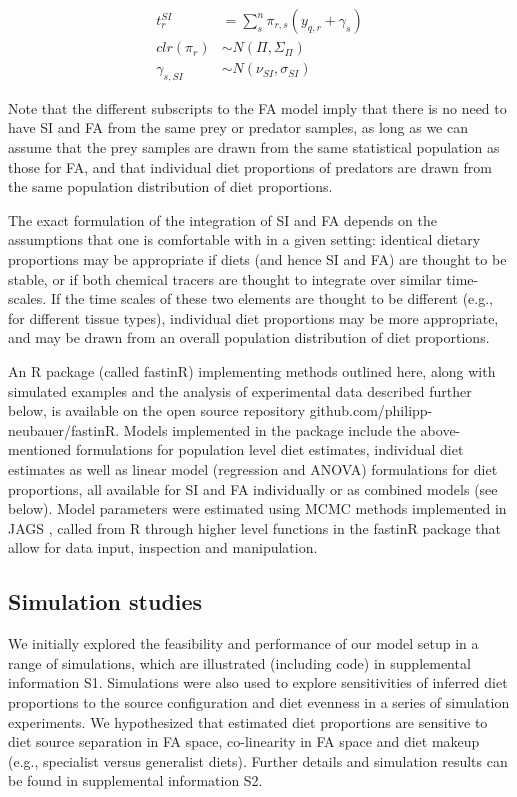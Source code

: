 \documentclass{article}%
\begin{document}
\begin{spacing}{1.9}
\begin{flushleft}
\begin{align}
\label{eq:3}
t_{r}^{SI} &=  \sum_{s}^n  \pi_{r,s}  \left(y_{q,r} + \gamma_{s} \right) \\
clr(\pi_{r}) &\sim N(\Pi,\Sigma_{\Pi})\\
\gamma_{s,SI} &\sim N(\nu_{SI},\sigma_{SI})
\end{align}


Note that the different subscripts to the FA model imply that there is no need to have SI and
FA from the same prey or predator samples, as long as we can assume that the prey samples are drawn
from the same statistical population as those for FA, and that individual diet proportions of
predators are drawn from the same population distribution of diet
proportions.

The exact formulation of the integration of SI and FA depends on the
assumptions that one is comfortable with in a given setting: identical
dietary proportions may be appropriate if diets (and hence SI and FA)
are thought to be stable, or if both chemical tracers are thought to
integrate over similar time-scales. If the time scales of these two
elements are thought to be different (e.g., for different tissue
types), individual diet proportions may be more
appropriate, and may be drawn from an overall population distribution
of diet proportions. 


An R \citep{R_core_2014}
package (called fastinR) implementing methods outlined here, along with simulated
examples and the analysis of
experimental data described further below, is available on the
open source repository github.com/philipp-neubauer/fastinR. Models
implemented in the package include the above-mentioned formulations
for population level diet estimates, individual diet
estimates  as well as linear model
(regression and ANOVA) formulations for diet proportions, all
available for SI and FA individually or as combined models (see
below). Model parameters were estimated using MCMC methods
implemented in JAGS \citep{plummer_jags_2003}, called
from R through higher level functions in the
fastinR package that allow for data input,
 inspection and manipulation.

\subsection{Simulation studies}

We initially explored the feasibility and performance of our model setup in a
range of simulations, which are illustrated (including code) in supplemental information S1. Simulations were also used to explore sensitivities of inferred diet proportions to the source
configuration and diet evenness in a series of
simulation experiments. We hypothesized that estimated diet
proportions are sensitive to diet source separation in FA space,
co-linearity in FA space \citep{blanchard_inference_2011} and diet makeup (e.g., specialist versus 
generalist diets). Further details and simulation results can be found
in supplemental information S2.


\end{flushleft}
\end{spacing}
\end{document}
